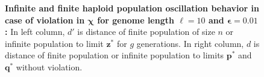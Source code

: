 \begin{figure}[h]
\begin{center}
\hspace{-3em}%
\vspace{-0.5em} \hspace{-3em}%

\caption[\textbf{Infinite and finite haploid population oscillation behavior in case of violation in $\bm{\chi}$ for genome length $\ell = 10$ and $\bm{\epsilon} = 0.01$}]{\textbf{Infinite and finite haploid population oscillation behavior in case of violation in $\bm{\chi}$ for genome length $\ell = 10$ and $\bm{\epsilon} = 0.01$:} 
  In left column, $d'$ is distance of finite population of size $n$ or infinite population to limit $\bm{z}^\ast$ for $g$ generations. In right column, $d$ is distance of finite population or infinite population to limits $\bm{p}^\ast$ and $\bm{q}^\ast$ without violation.}
\label{oscillation_10h_vio_chi_0.01}
\end{center}
\end{figure}


